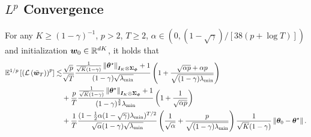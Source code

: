 \subsection{\texorpdfstring{$L^p$}{Lp} Convergence}
\begin{theorem}[$L^p$ Convergence]\label{thm:lp_error_linear_ctd}
For any $K\geq (1-\gamma)^{-1}$, $p>2$, $T\geq 2$, $\alpha\in(0,(1-\sqrt\gamma)/[38(p+\log T)])$ and initialization ${\bm{w}}_0\in{\mathbb R}^{dK}$, it holds that
    \begin{equation*}
    \begin{aligned}
              {\mathbb E}^{1/p}\left[{\left({{\mathcal{L}}\left({\bar{{\bm{w}}}_T}\right)}\right)^p}\right]\lesssim&\frac{\sqrt{p}}{\sqrt{T}}\frac{\frac{1}{\sqrt{K}(1-\gamma)}\left\|{{\bm{\theta}}^{\star}}\right\|_{{\bm{I}}_K\otimes{\bm{\Sigma}}_{{\bm{\phi}}}}+1}{(1-\gamma)\sqrt{\lambda_{\min}}}\left({1+\frac{\sqrt{\alpha p}+\alpha p}{\sqrt{(1-\gamma)\lambda_{\min}}}}\right)\\
        &+\frac{p}{T}\frac{\frac{1}{\sqrt{K}(1-\gamma)}\left\|{{\bm{\theta}}^{\star}}\right\|_{{\bm{I}}_K\otimes{\bm{\Sigma}}_{{\bm{\phi}}}}+1}{(1-\gamma)^{\frac{3}{2}}\lambda_{\min}}\left({1+\frac{1}{\sqrt{\alpha p}}}\right)\\
        &+\frac{1}{T}\frac{(1-\frac{1}{2}\alpha (1-\sqrt\gamma)\lambda_{\min} )^{T/2}}{ \sqrt{\alpha}(1-\gamma)\sqrt{\lambda_{\min}}}\left({\frac{1}{\sqrt\alpha}+\frac{p}{\sqrt{ (1-\gamma)\lambda_{\min}}}}\right)\frac{1}{\sqrt{K}(1-\gamma)}\left\|{{\bm{\theta}}_0-{\bm{\theta}}^{\star}}\right\|.
    \end{aligned}
    \end{equation*}
\end{theorem}

